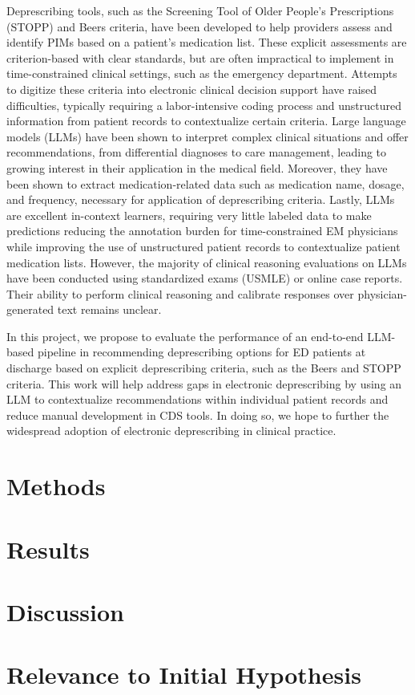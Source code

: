 Deprescribing tools, such as the Screening Tool of Older People’s Prescriptions (STOPP) and Beers criteria, have been developed to help providers assess and identify PIMs based on a patient’s medication list\citep{candeiasPotentiallyInappropriateMedications2021,bythe2023americangeriatricssocietybeerscriteriarupdateexpertpanelAmericanGeriatricsSociety2023,kaufmannInappropriatePrescribingSystematic2014}. These explicit assessments are criterion-based with clear standards, but are often impractical to implement in time-constrained clinical settings, such as the emergency department\citep{leeChallengesOpportunitiesCreating2022}. Attempts to digitize these criteria into electronic clinical decision support have raised difficulties, typically requiring a labor-intensive coding process and unstructured information from patient records to contextualize certain criteria\citep{anrysSTOPPSTARTVersion2016b,scottUsingEMRenabledComputerized2018}. Large language models (LLMs) have been shown to interpret complex clinical situations and offer recommendations, from differential diagnoses to care management, leading to growing interest in their application in the medical field\citep{clusmannFutureLandscapeLarge2023, gilsonHowDoesChatGPT2023, kungPerformanceChatGPTUSMLE2023, savageDiagnosticReasoningPrompts2024}. Moreover, they have been shown to extract medication-related data such as medication name, dosage, and frequency, necessary for application of deprescribing criteria\citep{goelLLMsAccelerateAnnotation2023}. Lastly, LLMs are excellent in-context learners, requiring very little labeled data to make predictions\citep{agrawal-etal-2022-large} reducing the annotation burden for time-constrained EM physicians while improving the use of unstructured patient records to contextualize patient medication lists. However, the majority of clinical reasoning evaluations on LLMs have been conducted using standardized exams (USMLE) or online case reports\citep{savageDiagnosticReasoningPrompts2024,savageLargeLanguageModel2024}. Their ability to perform clinical reasoning and calibrate responses over physician-generated text remains unclear. 

In this project, we propose to evaluate the performance of an end-to-end LLM-based pipeline in recommending deprescribing options for ED patients at discharge based on explicit deprescribing criteria, such as the Beers and STOPP criteria. This work will help address gaps in electronic deprescribing by using an LLM to contextualize recommendations within individual patient records and reduce manual development in CDS tools. In doing so, we hope to further the widespread adoption of electronic deprescribing in clinical practice.

\section{Methods}
\section{Results}
\section{Discussion}
\section{Relevance to Initial Hypothesis}
